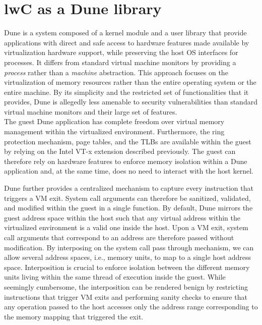 \documentclass[letterpaper,twocolumn,10pt]{article}
\begin{document}
\section{lwC as a Dune library}\label{lwc}
Dune is a system composed of a kernel module and a user library that provide applications with direct and safe access to hardware features made available by virtualization hardware support, while preserving the host OS interfaces for processes.
It differs from standard virtual machine monitors by providing a \emph{process} rather than a \emph{machine} abstraction. 
This approach focuses on the virtualization of memory resources rather than the entire operating system or the entire machine.
By its simplicity and the restricted set of functionalities that it provides, Dune is allegedly less amenable to security vulnerabilities than standard virtual machine monitors and their large set of features.\\

The guest Dune application has complete freedom over virtual memory management within the virtualized environment.
Furthermore, the ring protection mechanism, page tables, and the TLBs are available within the guest by relying on the Intel VT-x extension described previously.
The guest can therefore rely on hardware features to enforce memory isolation within a Dune application and, at the same time, does no need to interact with the host kernel.

Dune further provides a centralized mechanism to capture every instruction that triggers a VM exit.
System call arguments can therefore be sanitized, validated, and modified within the guest in a single function.
By default, Dune mirrors the guest address space within the host such that any virtual address within the virtualized environment is a valid one inside the host.
Upon a VM exit, system call arguments that correspond to an address are therefore passed without modification.
By interposing on the system call pass through mechanism, we can allow several address spaces, i.e., memory units, to map to a single host address space.
Interposition is crucial to enforce isolation between the different memory units living within the same thread of execution inside the guest.
While seemingly cumbersome, the interposition can be rendered benign by restricting instructions that trigger VM exits and performing sanity checks to ensure that any operation passed to the host accesses only the address range corresponding to the memory mapping that triggered the exit.\\
\end{document}
